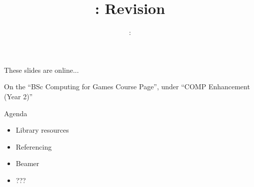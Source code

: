 \usepackage{../../beamerthemeFalmouthGamesAcademy}
\usepackage{multimedia}
\graphicspath{ {../../} }

\lstset{language=Python
}

\usepackage[normalem]{ulem}
\usepackage{wasysym}

\usepackage{pdfpages}

\usetikzlibrary{arrows,automata}




\title{\sessionnumber: Revision}
\subtitle{\modulecode: \moduletitle}

\frame{\titlepage} 

\begin{frame}{These slides are online...}
	\begin{center}
		On the ``BSc Computing for Games Course Page'', under ``COMP Enhancement (Year 2)''
	\end{center}
\end{frame}

\begin{frame}{Agenda}
	\begin{itemize}
		\item Library resources
		\item Referencing
		\item Beamer
		\item ???
	\end{itemize}
\end{frame}






